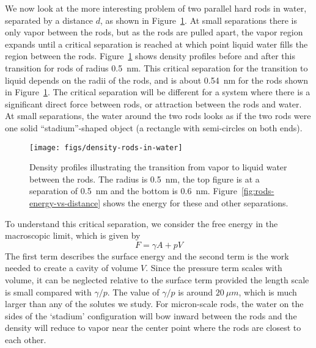 \documentclass[letterpaper,twocolumn,amsmath,amssymb,prb]{revtex4-1}
\begin{document}
We now look at the more interesting problem of two parallel hard rods
in water, separated by a distance $d$, as shown in
Figure~\ref{fig:density-rods}.  At small separations there is only vapor
between the rods, but as the rods are pulled apart, the vapor region
expands until a critical separation is reached at which point liquid
water fills the region between the rods.
Figure~\ref{fig:density-rods} shows density profiles before and after
this transition for rods of radius 0.5~nm. This critical separation
for the transition to liquid depends on the radii of the rods, and is
about 0.54~nm for the rods shown in Figure~\ref{fig:density-rods}.
The critical separation will be different for a system where there is
a significant direct force between rods, or attraction between the
rods and water.  At small separations, the water around the two
rods looks as if the two rods were one solid ``stadium''-shaped object
(a rectangle with semi-circles on both ends).


\begin{figure}
\begin{center}
\texttt{[image: figs/density-rods-in-water]}
\end{center}
\caption{ Density profiles illustrating the transition from vapor 
to liquid water between the rods. The radius is 0.5~nm, the top figure is 
at a separation of 0.5~nm and the
bottom is 0.6~nm. Figure~\ref{fig:rods-energy-vs-distance} shows
the energy for these and other separations.}
\label{fig:density-rods}
\end{figure}

To understand this critical separation, we consider the free energy in
the macroscopic limit, which is given by
\begin{equation}
F = \gamma A + pV
\end{equation}
The first term describes the surface energy and the second term is the
work needed to create a cavity of volume $V$. Since the pressure term
scales with volume, it can be neglected relative to the surface term
provided the length scale is small compared with $\gamma / p$. The
value of $\gamma / p$ is around $20~\mu m$, which is much larger than
any of the solutes we
study. For micron-scale rods, the water on the sides of the `stadium'
configuration will bow inward between the rods and the density will
reduce to vapor near the center point where the rods are closest to
each other.
\end{document}

